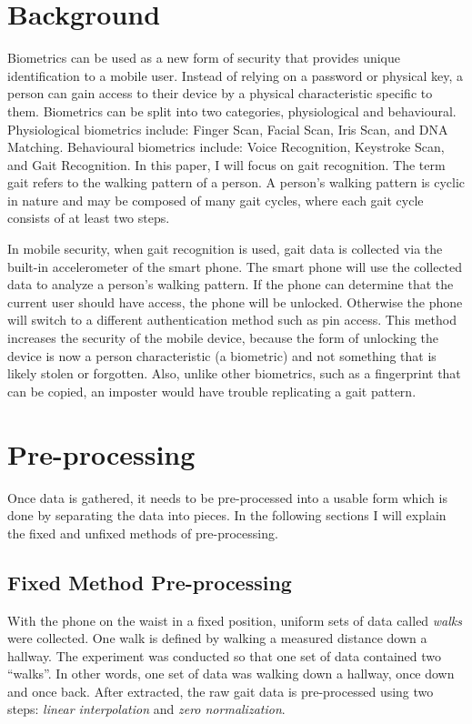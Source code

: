 \documentclass{sig-alternate}
\begin{document}
\section{Background}
	Biometrics can be used as a new form of security that provides unique identification to a mobile user. Instead of relying on a password or physical key, a person can gain access to their device by a physical characteristic specific to them. Biometrics can be split into two categories, physiological and behavioural. Physiological biometrics include: Finger Scan, Facial Scan, Iris Scan, and DNA Matching. Behavioural biometrics include: Voice Recognition, Keystroke Scan, and Gait Recognition. In this paper, I will focus on gait recognition. The term gait refers to the walking pattern of a person. A person's walking pattern is cyclic in nature and may be composed of many gait cycles, where each gait cycle consists of at least two steps.~\cite{Sujithra:2012} 
	
	In mobile security, when gait recognition is used, gait data is collected via the built-in accelerometer of the smart phone. The smart phone will use the collected data to analyze a person's walking pattern. If the phone can determine that the current user should have access, the phone will be unlocked. Otherwise the phone will switch to a different authentication method such as pin access. This method increases the security of the mobile device, because the form of unlocking the device is now a person characteristic (a biometric) and not something that is likely stolen or forgotten. Also, unlike other biometrics, such as a fingerprint that can be copied, an imposter would have trouble replicating a gait pattern.


\section{Pre-processing} 
	Once data is gathered, it needs to be pre-processed into a usable form which is done by separating the data into pieces. In the following sections I will explain the fixed and unfixed methods of pre-processing.

    
\subsection{Fixed Method Pre-processing}	
	With the phone on the waist in a fixed position, uniform sets of data called \textit{walks} were collected. One walk is defined by walking a measured distance down a hallway. The experiment was conducted so that one set of data contained two ``walks''. In other words, one set of data was walking down a hallway, once down and once back. After extracted, the raw gait data is pre-processed using two steps: \textit{linear interpolation} and \textit{zero normalization}. 
			
\end{document}
